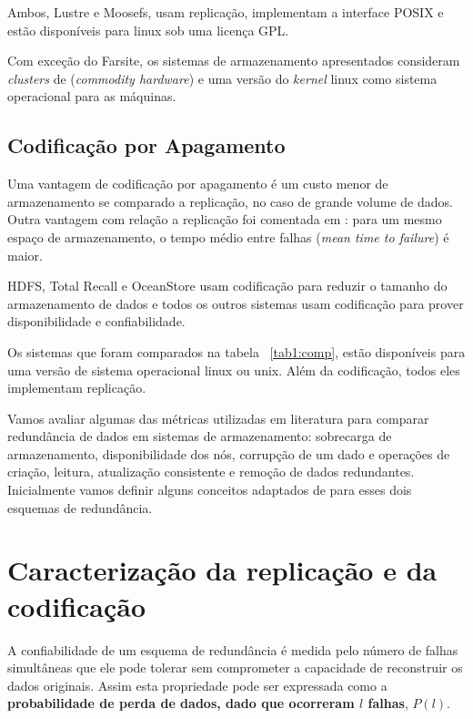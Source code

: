 Ambos, Lustre e Moosefs, usam replicação, implementam a interface POSIX e estão disponíveis para linux sob uma licença GPL.

Com exceção do Farsite, os sistemas de armazenamento apresentados consideram \emph{clusters} de (\emph{commodity hardware}) e uma versão do \emph{kernel} linux como sistema operacional para as máquinas.

\subsection{Codificação por Apagamento}

Uma vantagem de codificação por apagamento é um custo menor de armazenamento se comparado a replicação, no caso de grande volume de dados. Outra vantagem com relação a replicação foi comentada em \cite{Weatherspoon:2002:01}: para um mesmo espaço de armazenamento, o tempo médio entre falhas (\emph{mean time to failure}) é maior.



HDFS, Total Recall e OceanStore usam codificação para reduzir o tamanho do armazenamento de dados e todos os outros sistemas usam codificação para prover disponibilidade e confiabilidade.

Os sistemas que foram comparados na tabela ~\ref{tab1:comp}, estão disponíveis para uma versão de sistema operacional linux ou unix. Além da codificação, todos eles implementam replicação.

Vamos avaliar algumas das métricas utilizadas em literatura para comparar redundância de dados em sistemas de armazenamento: sobrecarga de armazenamento, disponibilidade dos nós, corrupção de um dado e operações de criação, leitura, atualização consistente e remoção de dados redundantes. Inicialmente vamos definir alguns conceitos adaptados de \cite{Duminoco:2009, Chiola:2005, Rodrigues:2005, Williams:2007} para esses dois esquemas de redundância.

\section{Caracterização da replicação e da codificação}

A confiabilidade de um esquema de redundância é medida pelo número de falhas simultâneas que ele pode tolerar sem comprometer a capacidade de reconstruir os dados originais. Assim esta propriedade pode ser expressada como a {\bf probabilidade de perda de dados, dado que ocorreram $l$ falhas}, $P(l)$.

